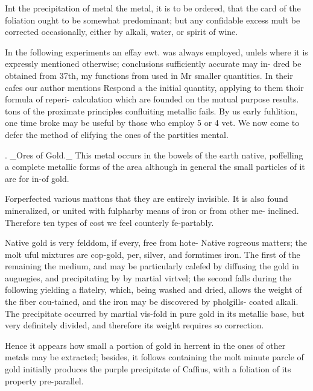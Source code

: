 Int the precipitation of metal the metal, it is to be ordered, that the card of the foliation ought to be somewhat predominant; but any confidable excess mult be corrected occasionally, either by alkali, water, or spirit of wine.\par\medskip
In the following experiments an effay ewt. was always employed, unlels where it is expressly mentioned otherwise; conclusions sufficiently accurate may in- dred be obtained from 37th, my functions from used in Mr smaller quantities. In their cafes our author mentions Respond a the initial quantity, applying to them thoir formula of reperi- calculation which are founded on the mutual purpose results. tons of the proximate principles confluiting metallic fails. By us early fuhlition, one time broke may be useful by those who employ 5 or 4 vet. We now come to defer the method of elifying the ones of the partities mental.\par{}. \_Ores of Gold.\_ This metal occurs in the bowels of the earth native, poffelling a complete metallic forms of the area although in general the small particles of it are for in-of gold.\par\medskip
Forperfected various mattons that they are entirely invisible. It is also found mineralized, or united with fulpharby means of iron or from other me- inclined. Therefore ten types of cost we feel counterly fe-partably.\par\medskip
Native gold is very felddom, if every, free from hote- Native rogreous matters; the molt uful mixtures are cop-gold, per, silver, and formtimes iron. The first of the remaining the medium, and may be particularly calefed by diffusing the gold in auguegies, and precipitating by by martial virtvel; the second falls during the following yielding a flatelry, which, being washed and dried, allows the weight of the fiber cou-tained, and the iron may be discovered by pholgills- coated alkali. The precipitate occurred by martial vis-fold in pure gold in its metallic base, but very definitely divided, and therefore its weight requires so correction.\par\medskip
Hence it appears how small a portion of gold in herrent in the ones of other metals may be extracted; besides, it follows containing the molt minute parcle of gold initially produces the purple precipitate of Caffius, with a foliation of its property pre-parallel.\par\medskip
